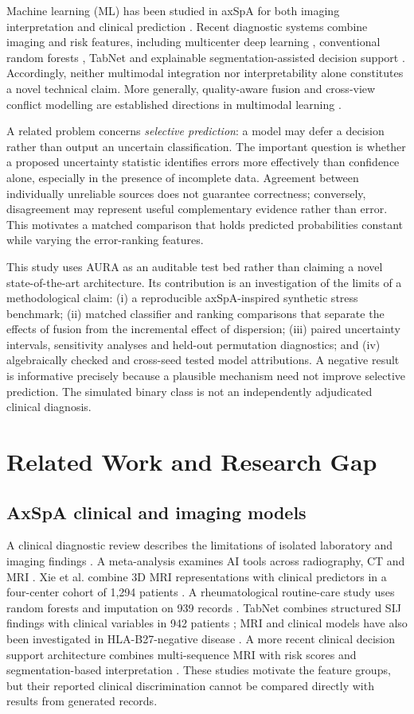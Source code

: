 \documentclass[conference]{IEEEtran}
\begin{document}
Machine learning (ML) has been studied in axSpA for both imaging interpretation and clinical prediction \cite{adams,meta}. Recent diagnostic systems combine imaging and risk features, including multicenter deep learning \cite{xie}, conventional random forests \cite{rf}, TabNet \cite{tabnet} and explainable segmentation-assisted decision support \cite{cdss}. Accordingly, neither multimodal integration nor interpretability alone constitutes a novel technical claim. More generally, quality-aware fusion and cross-view conflict modelling are established directions in multimodal learning \cite{tmc,qamoe,aemrl}.

A related problem concerns \emph{selective prediction}: a model may defer a decision rather than output an uncertain classification. The important question is whether a proposed uncertainty statistic identifies errors more effectively than confidence alone, especially in the presence of incomplete data. Agreement between individually unreliable sources does not guarantee correctness; conversely, disagreement may represent useful complementary evidence rather than error. This motivates a matched comparison that holds predicted probabilities constant while varying the error-ranking features.

This study uses AURA as an auditable test bed rather than claiming a novel state-of-the-art architecture. Its contribution is an investigation of the limits of a methodological claim: (i) a reproducible axSpA-inspired synthetic stress benchmark; (ii) matched classifier and ranking comparisons that separate the effects of fusion from the incremental effect of dispersion; (iii) paired uncertainty intervals, sensitivity analyses and held-out permutation diagnostics; and (iv) algebraically checked and cross-seed tested model attributions. A negative result is informative precisely because a plausible mechanism need not improve selective prediction. The simulated binary class is not an independently adjudicated clinical diagnosis.
\section{Related Work and Research Gap}
\subsection{AxSpA clinical and imaging models}
A clinical diagnostic review describes the limitations of isolated laboratory and imaging findings \cite{clinical}. A meta-analysis examines AI tools across radiography, CT and MRI \cite{meta}. Xie et al. combine 3D MRI representations with clinical predictors in a four-center cohort of 1,294 patients \cite{xie}. A rheumatological routine-care study uses random forests and imputation on 939 records \cite{rf}. TabNet combines structured SIJ findings with clinical variables in 942 patients \cite{tabnet}; MRI and clinical models have also been investigated in HLA-B27-negative disease \cite{negative}. A more recent clinical decision support architecture combines multi-sequence MRI with risk scores and segmentation-based interpretation \cite{cdss}. These studies motivate the feature groups, but their reported clinical discrimination cannot be compared directly with results from generated records.
\end{document}
